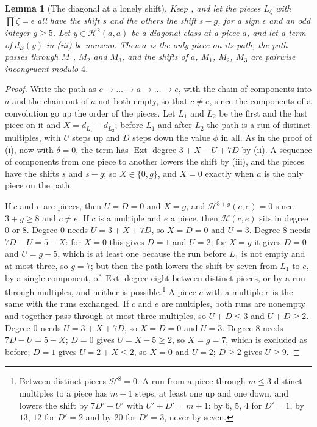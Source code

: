 \documentclass[11pt,reqno]{amsart}
\theoremstyle{plain}
\newtheorem{lemma}[theorem]{Lemma}
\theoremstyle{definition}
\theoremstyle{remark}
\newcommand{\cH}{\mathcal{H}}
\DeclareMathOperator{\Ext}{Ext}
\begin{document}
\begin{lemma}[The diagonal at a lonely shift]\label{lem:efourlonely}
Keep , and let the pieces $L_{\zeta}$ with
$\prod\zeta=\epsilon$ all have the shift $s$ and the others the shift $s-g$,
for a sign $\epsilon$ and an odd integer $g\ge5$. Let $y\in\cH^{2}(a,a)$ be
a diagonal class at a piece $a$, and let a term of $d_{E}(y)$ in
(iii) be nonzero. Then $a$ is the only piece on its
path, the path passes through $M_{1}$, $M_{2}$ and $M_{3}$, and the shifts
of $a$, $M_{1}$, $M_{2}$, $M_{3}$ are pairwise incongruent modulo $4$.
\end{lemma}

\begin{proof}
Write the path as $c\to\dots\to a\to\dots\to e$, with the chain of
components into $a$ and the chain out of $a$ not both empty, so that
$c\ne e$, since the components of a convolution go up the order of the
pieces. Let $L_{1}$ and $L_{2}$ be the first and the last piece on it and
$X=d_{L_{1}}-d_{L_{2}}$; before $L_{1}$ and after $L_{2}$ the path is a run
of distinct multiples, with $U$ steps up and $D$ steps down the value $\phi$
in all. As in the proof of (i), now with $\delta=0$,
the term has $\Ext$ degree $3+X-U+7D$ by (ii). A
sequence of components from one piece to another lowers the shift by
(iii), and the pieces have the shifts $s$ and $s-g$;
so $X\in\{0,g\}$, and $X=0$ exactly when $a$ is the only piece on the path.

If $c$ and $e$ are pieces, then $U=D=0$ and $X=g$, and $\cH^{3+g}(c,e)=0$
since $3+g\ge8$ and $c\ne e$. If $c$ is a multiple and $e$ a piece, then
$\cH(c,e)$ sits in degree $0$ or $8$. Degree $0$ needs $U=3+X+7D$, so
$X=D=0$ and $U=3$. Degree $8$ needs $7D-U=5-X$: for $X=0$ this gives $D=1$
and $U=2$; for $X=g$ it gives $D=0$ and $U=g-5$, which is at least one
because the run before $L_{1}$ is not empty and at most three, so $g=7$; but
then the path lowers the shift by seven from $L_{1}$ to $e$, by a single
component, of $\Ext$ degree eight between distinct pieces, or by a run
through multiples, and neither is possible.\footnote{Between distinct pieces
$\cH^{8}=0$. A run from a piece through $m\le3$ distinct multiples to a piece
has $m+1$ steps, at least one up and one down, and lowers the shift by
$7D'-U'$ with $U'+D'=m+1$: by $6$, $5$, $4$ for $D'=1$, by $13$, $12$ for
$D'=2$ and by $20$ for $D'=3$, never by seven.} A piece $c$ with a multiple $e$ is the same
with the runs exchanged. If $c$ and $e$ are multiples, both runs are
nonempty and together pass through at most three multiples, so $U+D\le3$
and $U+D\ge2$. Degree $0$ needs $U=3+X+7D$, so $X=D=0$ and $U=3$. Degree $8$
needs $7D-U=5-X$; $D=0$ gives $U=X-5\ge2$, so $X=g=7$, which is excluded as
before; $D=1$ gives $U=2+X\le2$, so $X=0$ and $U=2$; $D\ge2$ gives $U\ge9$.


\end{proof}
\end{document}
